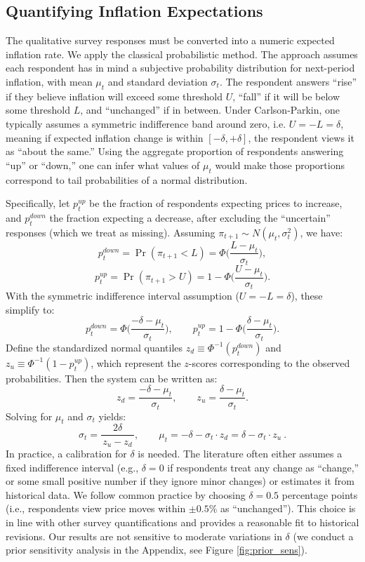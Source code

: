 \documentclass[12pt]{article}
\begin{document}
\subsection{Quantifying Inflation Expectations}\label{sec:cp_method}
The qualitative survey responses must be converted into a numeric expected inflation rate. We apply the classical \cite{Carlson1975} probabilistic method. The approach assumes each respondent has in mind a subjective probability distribution for next-period inflation, with mean $\mu_t$ and standard deviation $\sigma_t$. The respondent answers “rise” if they believe inflation will exceed some threshold $U$, “fall” if it will be below some threshold $L$, and “unchanged” if in between. Under Carlson-Parkin, one typically assumes a symmetric indifference band around zero, i.e. $U = -L = \delta$, meaning if expected inflation change is within $[-\delta, +\delta]$, the respondent views it as “about the same.” Using the aggregate proportion of respondents answering “up” or “down,” one can infer what values of $\mu_t$ would make those proportions correspond to tail probabilities of a normal distribution.

Specifically, let $p^{up}_t$ be the fraction of respondents expecting prices to increase, and $p^{down}_t$ the fraction expecting a decrease, after excluding the “uncertain” responses (which we treat as missing). Assuming $\pi_{t+1} \sim N(\mu_t, \sigma_t^2)$, we have:
\[
    p^{down}_t = \Pr(\pi_{t+1} < L) = \Phi\!\Big(\frac{L - \mu_t}{\sigma_t}\Big),
\]
\[
    p^{up}_t = \Pr(\pi_{t+1} > U) = 1 - \Phi\!\Big(\frac{U - \mu_t}{\sigma_t}\Big).
\]
With the symmetric indifference interval assumption ($U=-L=\delta$), these simplify to:
\[
    p^{down}_t = \Phi\!\Big(\frac{-\delta - \mu_t}{\sigma_t}\Big), \qquad
    p^{up}_t = 1 - \Phi\!\Big(\frac{\delta - \mu_t}{\sigma_t}\Big).
\]
Define the standardized normal quantiles $z_d \equiv \Phi^{-1}(p^{down}_t)$ and $z_u \equiv \Phi^{-1}(1 - p^{up}_t)$, which represent the $z$-scores corresponding to the observed probabilities. Then the system can be written as:
\[
    z_d = \frac{-\delta - \mu_t}{\sigma_t}, \qquad z_u = \frac{\delta - \mu_t}{\sigma_t}.
\]
Solving for $\mu_t$ and $\sigma_t$ yields:
\[
    \sigma_t = \frac{2\delta}{\,z_u - z_d\,}, \qquad
    \mu_t = -\delta - \sigma_t \cdot z_d = \delta - \sigma_t \cdot z_u~.
\]
In practice, a calibration for $\delta$ is needed. The literature often either assumes a fixed indifference interval (e.g., $\delta = 0$ if respondents treat any change as “change,” or some small positive number if they ignore minor changes) or estimates it from historical data. We follow common practice by choosing $\delta = 0.5$ percentage points (i.e., respondents view price moves within $\pm0.5\%$ as “unchanged”). This choice is in line with other survey quantifications and provides a reasonable fit to historical revisions. Our results are not sensitive to moderate variations in $\delta$ (we conduct a prior sensitivity analysis in the Appendix, see Figure \ref{fig:prior_sens}).
\end{document}

